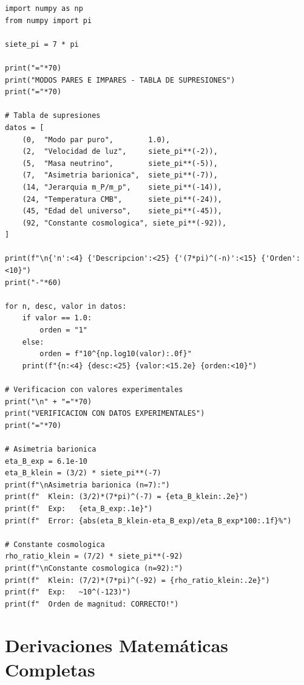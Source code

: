 \documentclass[12pt,a4paper,openany]{book}
\begin{document}
\begin{nivelcodigo}

\begin{lstlisting}[caption={Verificación de reglas de paridad}]
import numpy as np
from numpy import pi

siete_pi = 7 * pi

print("="*70)
print("MODOS PARES E IMPARES - TABLA DE SUPRESIONES")
print("="*70)

# Tabla de supresiones
datos = [
    (0,  "Modo par puro",        1.0),
    (2,  "Velocidad de luz",     siete_pi**(-2)),
    (5,  "Masa neutrino",        siete_pi**(-5)),
    (7,  "Asimetria barionica",  siete_pi**(-7)),
    (14, "Jerarquia m_P/m_p",    siete_pi**(-14)),
    (24, "Temperatura CMB",      siete_pi**(-24)),
    (45, "Edad del universo",    siete_pi**(-45)),
    (92, "Constante cosmologica", siete_pi**(-92)),
]

print(f"\n{'n':<4} {'Descripcion':<25} {'(7*pi)^(-n)':<15} {'Orden':<10}")
print("-"*60)

for n, desc, valor in datos:
    if valor == 1.0:
        orden = "1"
    else:
        orden = f"10^{np.log10(valor):.0f}"
    print(f"{n:<4} {desc:<25} {valor:<15.2e} {orden:<10}")

# Verificacion con valores experimentales
print("\n" + "="*70)
print("VERIFICACION CON DATOS EXPERIMENTALES")
print("="*70)

# Asimetria barionica
eta_B_exp = 6.1e-10
eta_B_klein = (3/2) * siete_pi**(-7)
print(f"\nAsimetria barionica (n=7):")
print(f"  Klein: (3/2)*(7*pi)^(-7) = {eta_B_klein:.2e}")
print(f"  Exp:   {eta_B_exp:.1e}")
print(f"  Error: {abs(eta_B_klein-eta_B_exp)/eta_B_exp*100:.1f}%")

# Constante cosmologica
rho_ratio_klein = (7/2) * siete_pi**(-92)
print(f"\nConstante cosmologica (n=92):")
print(f"  Klein: (7/2)*(7*pi)^(-92) = {rho_ratio_klein:.2e}")
print(f"  Exp:   ~10^(-123)")
print(f"  Orden de magnitud: CORRECTO!")
\end{lstlisting}

\end{nivelcodigo}

\appendix
\chapter{Derivaciones Matemáticas Completas}
\end{document}
